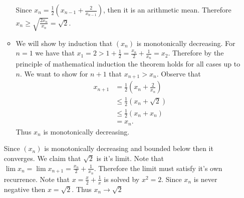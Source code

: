 \documentclass[12pt, letterpaper]{article}
\begin{document}
\begin{enumerate}
\begin{itemize}
	 	Since $x_n = \frac{1}{2}(x_{n-1} + \frac{2}{x_{n-1}})$, then it is an arithmetic mean.  Therefore $x_n \geq \sqrt{\frac{2x_n}{x_n}} = \sqrt{2}$.  
	 	\item We will show by induction that $(x_n)$ is monotonically decreasing.  
	 	For $n=1$ we have that $x_1 = 2 > 1 + \frac{1}{2} = \frac{x_n}{2} + \frac{1}{x_n} = x_2$.  Therefore by the principle of mathematical induction the theorem holds for all cases up to $n$.  We want to show for $n+1$ that $x_{n+1} > x_n$.  Observe that
	 	\begin{align*}
	 		x_{n+1} &= \frac{1}{2}(x_{n} + \frac{2}{x_{n}})\\
	 		&\leq \frac{1}{2}(x_{n} + \sqrt{2})\\
	 		&\leq \frac{1}{2}(x_{n} + x_n)\\
	 		&= x_n.
	 	\end{align*}
	 	Thus $x_n$ is monotonically decreasing.
	 \end{itemize}
	 Since $(x_n)$ is monotonically decreasing and bounded below then it converges.  
	 We claim that $\sqrt{2}$ is it's limit.  Note that $\lim x_n = \lim x_{n+1} = \frac{x_n}{2} + \frac{1}{x_n}$.  Therefore the limit must satisfy it's own recurrence.
	 Note that $x = \frac{x}{2} + \frac{1}{x}$ is solved by $x^2 = 2$.  Since $x_n$ is never negative then $x =\sqrt{2}$.  Thus $x_n \to \sqrt{2}$
	  
\end{enumerate}
\end{document}
